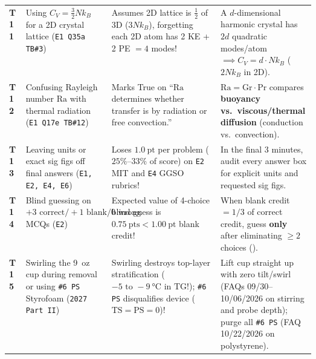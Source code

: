 {\begin{tabularx}{\linewidth}{@{}l L{0.28\linewidth} X L{0.31\linewidth}@{}}
\textbf{T11} & Using $C_V = \frac{3}{2}Nk_B$ for a 2D crystal lattice (\texttt{E1 Q35a TB\#3}) & Assumes 2D lattice is $\frac{1}{2}$ of 3D ($3Nk_B$), forgetting each 2D atom has 2 KE + 2 PE $= 4$ modes! & A $d$-dimensional harmonic crystal has $2d$ quadratic modes/atom $\implies C_V = d\cdot Nk_B$ ($2Nk_B$ in 2D). \\
\textbf{T12} & Confusing Rayleigh number $\mathrm{Ra}$ with thermal radiation (\texttt{E1 Q17e TB\#12}) & Marks True on ``$\mathrm{Ra}$ determines whether transfer is by radiation or free convection.'' & $\mathrm{Ra} = \mathrm{Gr}\cdot\mathrm{Pr}$ compares \textbf{buoyancy vs.\ viscous/thermal diffusion} (conduction vs.\ convection). \\
\textbf{T13} & Leaving units or exact sig figs off final answers (\texttt{E1, E2, E4, E6}) & Loses $\SI{1.0}{\text{pt}}$ per problem ($25\%\text{--}33\%$ of score) on \texttt{E2} MIT and \texttt{E4} GGSO rubrics! & In the final 3 minutes, audit every answer box for explicit units and requested sig figs. \\
\textbf{T14} & Blind guessing on $+3\text{ correct} / +1\text{ blank} / 0\text{ wrong}$ MCQs (\texttt{E2}) & Expected value of 4-choice blind guess is $\SI{0.75}{\text{pts}} < \SI{1.00}{\text{pt}}$ blank credit! & When blank credit $= 1/3$ of correct credit, guess \textbf{only} after eliminating $\ge 2$ choices (). \\
\textbf{T15} & Swirling the \SI{9}{oz} cup during removal or using \texttt{\#6 PS} Styrofoam (\texttt{2027 Part II}) & Swirling destroys top-layer stratification ($-5\text{ to }-\SI{9}{\celsius}$ in $\mathrm{TG}$!); \texttt{\#6 PS} disqualifies device ($\mathrm{TS}=\mathrm{PS}=0$)! & Lift cup straight up with zero tilt/swirl (FAQs 09/30--10/06/2026 on stirring and probe depth); purge all \texttt{\#6 PS} (FAQ 10/22/2026 on polystyrene). \\
\bottomrule
\end{tabularx}
\par}\smallskip

